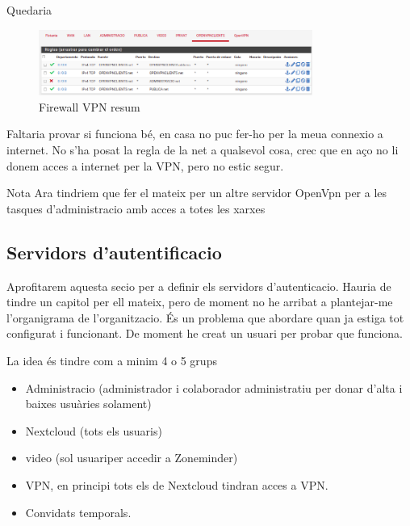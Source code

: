 \documentclass[
  10pt,
]{krantz}
\providecommand{\tightlist}{%
  \setlength{\itemsep}{0pt}\setlength{\parskip}{0pt}}
\begin{document}
Quedaria

\begin{figure}
\centering
\includegraphics[width=0.8\textwidth,height=\textheight]{imatges/proxmox/regle_vpn_resum.png}
\caption{Firewall VPN resum}
\end{figure}

Faltaria provar si funciona bé, en casa no puc fer-ho per la meua connexio a internet. No s'ha posat la regla de la net a qualsevol cosa, crec que en aço no li donem acces a internet per la VPN, pero no estic segur.

\begin{rmdnote}{Nota}
Ara tindriem que fer el mateix per un altre servidor OpenVpn per a les tasques d'administracio amb acces a totes les xarxes

\end{rmdnote}

\hypertarget{servidors-dautentificacio}{%
\subsection{Servidors d'autentificacio}\label{servidors-dautentificacio}}

Aprofitarem aquesta secio per a definir els servidors d'autenticacio. Hauria de tindre un capitol per ell mateix, pero de moment no he arribat a plantejar-me l'organigrama de l'organitzacio. És un problema que abordare quan ja estiga tot configurat i funcionant. De moment he creat un usuari per probar que funciona.

La idea és tindre com a minim 4 o 5 grups

\begin{itemize}
\tightlist
\item
  Administracio (administrador i colaborador administratiu per donar d'alta i baixes usuàries solament)
\item
  Nextcloud (tots els usuaris)
\item
  video (sol usuariper accedir a Zoneminder)
\item
  VPN, en principi tots els de Nextcloud tindran acces a VPN.
\item
  Convidats temporals.
\end{itemize}
\end{document}
